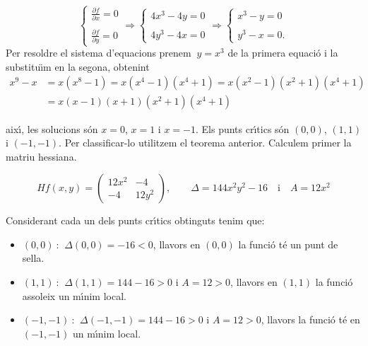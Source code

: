 \documentclass[12pt]{article}
\begin{document}
\[
\begin{cases}
\displaystyle\frac{\partial f}{\partial x} = 0 \\
 \\
 \displaystyle\frac{\partial f}{\partial y} = 0
\end{cases} \Longrightarrow \begin{cases}
4x ^ 3 - 4y = 0 \\
\\
4y ^ 3-4x = 0
\end{cases} \Longrightarrow \begin{cases}
x ^ 3 - y = 0 \\
\\
y ^ 3 - x = 0.
\end{cases}
\]
Per resoldre el sistema d'equacions prenem $\ y = x ^ 3 $ de la
primera equaci{\'o} i la substitu{\"\i}m en la segona, obtenint
\begin{align*}
x ^ 9-x & = x (x ^ 8 -1) = x (x ^ 4 -1) (x ^ 4 +1) = x (x ^ 2-1) (x ^ 2 +1) (x ^ 4 +1) \\& = x (x-1) (x +1) (x ^ 2 +1) (x ^ 4 +1)
\end{align*}

\noindent aix{\'\i}, les solucions s{\'o}n $ x = 0 $, $ x = 1 $ i $ x =- 1 $. Els
punts cr{\'\i}tics s{\'o}n $ (0,0) $, $ (1,1) $ i $ (-1, -1) $. Per
classificar-lo utilitzem el teorema anterior. Calculem primer
la matriu hessiana.

\[
Hf (x, y) =
  \left (\begin{matrix}
    12x ^ 2 & -4 \\    -4 & 12y ^ 2
  \end{matrix}\right), \qquad \Delta = 144 x ^ 2 y ^ 2 -16 \quad \mbox{i} \quad
  A = 12x ^ 2
\]

Considerant cada un dels punts cr{\'\i}tics obtinguts tenim
que:
\begin{itemize}
\item [] $ (0,0)\ $: $\ \Delta (0,0) =- 16 <0 $, llavors en $ (0,0) $ la
funci{\'o} t{\'e} un punt de sella.
\item [] $ (1,1)\ $: $\ \Delta (1,1) = 144-16> 0 $ i $ A = 12> 0 $,
llavors en $ (1,1) $ la funci{\'o} assoleix un m{\'\i}nim local.
\item [] $ (-1, -1)\ $: $\ \Delta (-1, -1) = 144-16> 0 $ i $ A = 12> 0 $,
llavors  la funci{\'o} t{\'e} en $ (-1, -1) $ un m{\'\i}nim local.
\end{itemize}
\end{document}
